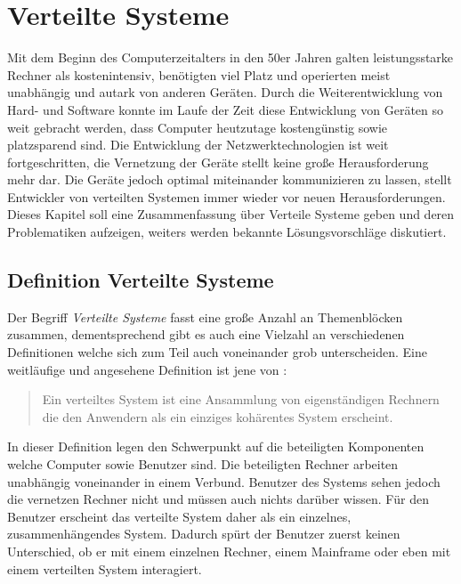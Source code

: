 \chapter{Verteilte Systeme}\label{cha:distributedSystems}
Mit dem Beginn des Computerzeitalters in den 50er Jahren galten leistungsstarke Rechner als kostenintensiv, benötigten viel Platz und operierten meist unabhängig und autark von anderen Geräten. Durch die Weiterentwicklung von Hard- und Software konnte im Laufe der Zeit diese Entwicklung von Geräten so weit gebracht werden, dass Computer heutzutage kostengünstig sowie platzsparend sind. Die Entwicklung der Netzwerktechnologien ist weit fortgeschritten, die Vernetzung der Geräte stellt keine große Herausforderung mehr dar. Die Geräte jedoch optimal miteinander kommunizieren zu lassen, stellt Entwickler von verteilten Systemen immer wieder vor neuen Herausforderungen. \citep{designingDistributedSystems} \\
Dieses Kapitel soll eine Zusammenfassung über Verteile Systeme geben und deren Problematiken aufzeigen, weiters werden bekannte Lösungsvorschläge diskutiert.

\section{Definition Verteilte Systeme}\label{sec:distributedSystems:definition}
Der Begriff \textit{Verteilte Systeme} fasst eine große Anzahl an Themenblöcken zusammen, dementsprechend gibt es auch eine Vielzahl an verschiedenen Definitionen welche sich zum Teil auch voneinander grob unterscheiden. Eine weitläufige und angesehene Definition ist jene von \cite{tanenbaum2007distributed}:
\begin{quote}
  Ein verteiltes System ist eine Ansammlung von eigenständigen Rechnern die den Anwendern als ein einziges kohärentes System erscheint.
  \label{quote:distributedSystem:tanenbaum}
\end{quote}
In dieser Definition legen \cite{tanenbaum2007distributed} den Schwerpunkt auf die beteiligten Komponenten welche Computer sowie Benutzer sind. Die beteiligten Rechner arbeiten unabhängig voneinander in einem Verbund. Benutzer des Systems sehen jedoch die vernetzen Rechner nicht und müssen auch nichts darüber wissen. Für den Benutzer erscheint das verteilte System daher als ein einzelnes, zusammenhängendes System. Dadurch spürt der Benutzer zuerst keinen Unterschied, ob er mit einem einzelnen Rechner, einem Mainframe oder eben mit einem verteilten System interagiert. \\

